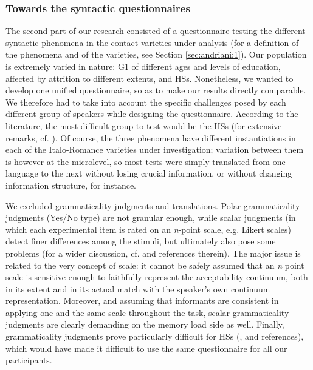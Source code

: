 \documentclass[output=paper,hidelinks]{langscibook}
\begin{document}
\subsubsection{Towards the syntactic questionnaires}

The second part of our research consisted of a questionnaire testing the different syntactic phenomena in the contact varieties under analysis (for a definition of the phenomena and of the varieties, see Section \ref{sec:andriani:1}). Our population is extremely varied in nature: G1 of different ages and levels of education, affected by attrition to different extents, and HSs. Nonetheless, we wanted to develop one unified questionnaire, so as to make our results directly comparable. We therefore had to take into account the specific challenges posed by each different group of speakers while designing the questionnaire. According to the literature, the most difficult group to test would be the HSs (for extensive remarks, cf. \citealt[chapter 3]{Polinsky2018}). Of course, the three phenomena have different instantiations in each of the Italo-Romance varieties under investigation; variation between them is however at the microlevel, so most tests were simply translated from one language to the next without losing crucial information, or without changing information structure, for instance.

We excluded grammaticality judgments and translations. Polar grammaticality judgments (Yes/No type) are not granular enough, while scalar judgments (in which each experimental item is rated on an \textit{n}-point scale, e.g. Likert scales) detect finer differences among the stimuli, but ultimately also pose some problems (for a wider discussion, cf. \citealt{StadthagenGonzlezEtAl2018} and references therein). The major issue is related to the very concept of scale: it cannot be safely assumed that an \textit{n} point scale is sensitive enough to faithfully represent the acceptability continuum, both in its extent and in its actual match with the speaker’s own continuum representation. Moreover, and assuming that informants are consistent in applying one and the same scale throughout the task, scalar grammaticality judgments are clearly demanding on the memory load side as well. Finally, grammaticality judgments prove particularly difficult for HSs (\citealt[chapter 3]{Polinsky2018}, and references), which would have made it difficult to use the same questionnaire for all our participants.
\end{document}
